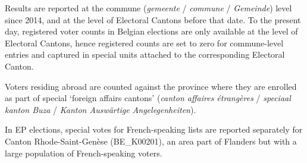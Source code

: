Results are reported at the commune (\textit{gemeente} / \textit{commune} / \textit{Gemeinde}) level
since 2014, and at the level of Electoral Cantons before that date.
To the present day, registered voter counts in Belgian elections are only
available at the level of Electoral Cantons, hence registered counts are set 
to zero for commune-level entries and captured in special units attached to the corresponding Electoral Canton.

Voters residing abroad are counted against the province where they are enrolled
as part of special `foreign affairs cantons' (\emph{canton affaires étrangères} /
\emph{speciaal kanton Buza} / \emph{Kanton Auswärtige Angelegenheiten}).

In EP elections, special votes for French-speaking lists are reported separately for Canton 
Rhode-Saint-Genèse (BE\_K00201), an area part of Flanders but with a large population of French-speaking voters.
